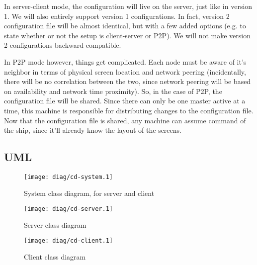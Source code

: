 In server-client mode, the configuration will live on the server, just like in
version 1. We will also entirely support version 1 configurations. In fact, 
version 2 configuration file will be almost identical, but with a few added
options (e.g. to state whether or not the setup is client-server or P2P). We 
will not make version 2 configurations backward-compatible.

In P2P mode however, things get complicated. Each node must be aware of it's
neighbor in terms of physical screen location and network peering
(incidentally, there will be no correlation between the two, since network 
peering will be based on availability and network time proximity). So, in the
case of P2P, the configuration file will be shared. Since there can only be
one master active at a time, this machine is responsible for distributing
changes to the configuration file. Now that the configuration file is shared,
any machine can assume command of the ship, since it'll already know the layout
of the screens.

\clearpage
\subsection{UML}

\begin{figure}[ht!]
  \begin{center}
    \texttt{[image: diag/cd-system.1]}
    \caption{System class diagram, for server and client}
    \label{fig:systemClassDiagram}
  \end{center}
\end{figure}

\begin{figure}[ht!]
  \begin{center}
    \texttt{[image: diag/cd-server.1]}
    \caption{Server class diagram}
    \label{fig:serverClassDiagram}
  \end{center}
\end{figure}

\begin{figure}[ht!]
  \begin{center}
    \texttt{[image: diag/cd-client.1]}
    \caption{Client class diagram}
    \label{fig:clientClassDiagram}
  \end{center}
\end{figure}

